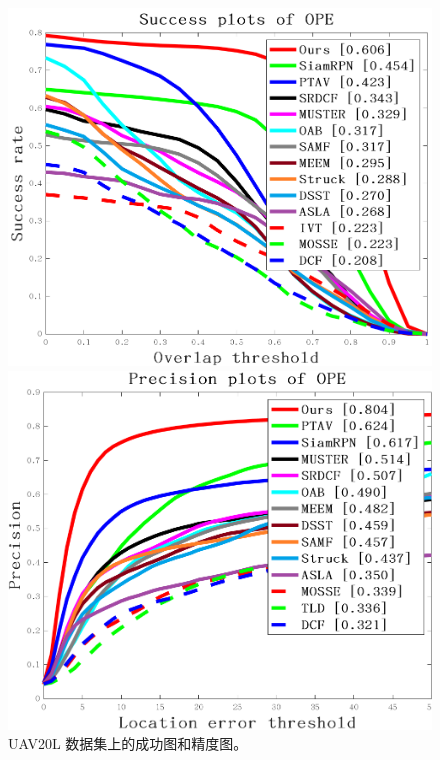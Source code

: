 \begin{figure}[t]
\begin{minipage}{0.5\textwidth}
  \centering
  \centerline{\includegraphics[width=1.0\textwidth]{Img/end/quality_plot_overlap_OPE_AUC.png}}
\end{minipage}
\hfill
\begin{minipage}{0.5\textwidth}
  \centering
  \centerline{\includegraphics[width=1.0\textwidth]{Img/end/quality_plot_error_OPE_threshold.png}}
\end{minipage}
\caption{UAV20L 数据集上的成功图和精度图。}
\label{fig:uav20l}
\end{figure}


